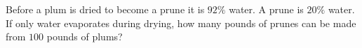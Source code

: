 Before a plum is dried to become a prune it is $92\%$ water. A prune is $20\%$ water. If only water evaporates during drying, how many pounds of prunes can be made from $100$ pounds of plums?

